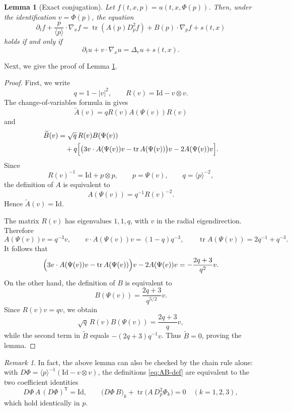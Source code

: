 \documentclass[11pt,reqno]{amsart}
\numberwithin{equation}{section}
\newtheorem{lemma}[theorem]{Lemma}
\theoremstyle{remark}
\newtheorem{remark}[theorem]{Remark}
\DeclareMathOperator{\tr}{tr}
\newcommand{\Id}{\mathrm{Id}}
\newcommand{\la}[1]{\langle #1\rangle}
\begin{document}
\begin{lemma}[Exact conjugation]\label{lem:conjugation}
Let $f(t,x,p)=u(t,x,\Phi(p))$.  Then, under the identification $v=\Phi(p)$, the equation
\begin{equation}\label{eq:exact-conj}
   \partial_t f+\frac{p}{\la p}\cdot\nabla_xf
   =\tr(A(p)D_p^2f)+B(p)\cdot\nabla_pf+s(t,x)
\end{equation}
holds if and only if
\begin{equation}\label{eq:kolmo}
   \partial_tu+v\cdot\nabla_xu=\Delta_vu+s(t,x).
\end{equation}
\end{lemma}
Next, we give the proof of Lemma \ref{lem:conjugation}.
\begin{proof}
First, we write
\[
   q=1-|v|^2,
   \qquad
   R(v)=\Id-v\otimes v.
\]
The change-of-variables formula in \cite[Lemma~6.3]{HSTT} gives
\[
   \widetilde A(v)=qR(v)A(\Psi(v))R(v)
\]
and
\[
\begin{aligned}
   \widetilde B(v)
   &=\sqrt q\,R(v)B(\Psi(v)) \\
   &\quad+q\Bigl[\bigl(3v\cdot A(\Psi(v))v-\tr A(\Psi(v))\bigr)v
          -2A(\Psi(v))v\Bigr].
\end{aligned}
\]
Since
\[
   R(v)^{-1}=\Id+p\otimes p,
   \qquad p=\Psi(v),
   \qquad q=\la p^{-2},
\]
the definition of $A$ is equivalent to
\[
   A(\Psi(v))=q^{-1}R(v)^{-2}.
\]
Hence $\widetilde A(v)=\Id$.

The matrix $R(v)$ has eigenvalues $1,1,q$, with $v$ in the radial eigendirection.  Therefore
\[
   A(\Psi(v))v=q^{-3}v,
   \qquad
   v\cdot A(\Psi(v))v=(1-q)q^{-3},
   \qquad
   \tr A(\Psi(v))=2q^{-1}+q^{-3}.
\]
It follows that
\[
   \Bigl(3v\cdot A(\Psi(v))v-\tr A(\Psi(v))\Bigr)v
   -2A(\Psi(v))v
   =-\frac{2q+3}{q^2}v.
\]
On the other hand, the definition of $B$ is equivalent to
\[
   B(\Psi(v))=\frac{2q+3}{q^{5/2}}v.
\]
Since $R(v)v=qv$, we obtain
\[
   \sqrt q\,R(v)B(\Psi(v))=\frac{2q+3}{q}v,
\]
while the second term in $\widetilde B$ equals $-(2q+3)q^{-1}v$.  Thus
$\widetilde B=0$, proving the lemma.
\end{proof}

\begin{remark}\label{rem:direct}
In fact, the above lemma can also be checked by the chain rule alone: with $D\Phi=\la p^{-1}(\Id-v\otimes v)$, the definitions \eqref{eq:AB-def} are equivalent to the two coefficient identities
\[
   D\Phi\,A\,(D\Phi)^{\mathsf T}=\Id,
   \qquad
   \bigl(D\Phi\,B\bigr)_k+\tr\!\bigl(A\,D_p^2\Phi_k\bigr)=0
   \quad(k=1,2,3),
\]
which hold identically in $p$.
\end{remark}
\end{document}
